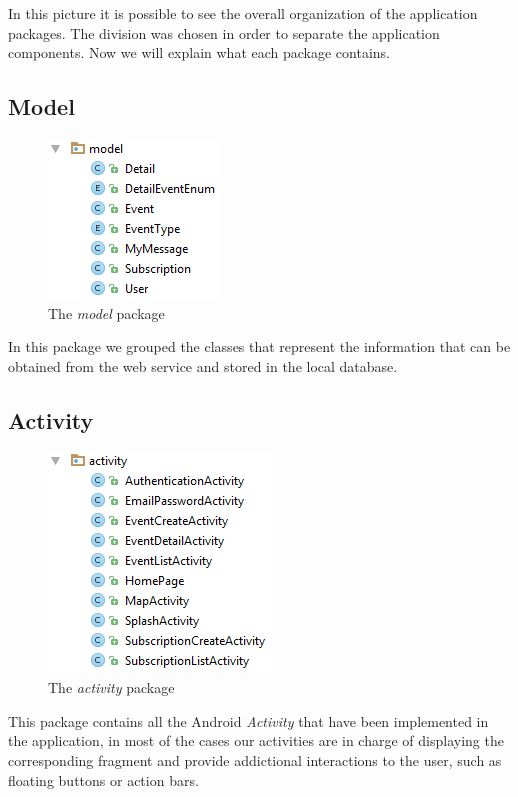 \documentclass[a4paper]{scrreprt}
\begin{document}
In this picture it is possible to see the overall organization of the application packages. The division was chosen in order to separate the application components. Now we will explain what each package contains.

\subsection{Model}
\begin{figure}[H]
	\centering
	\includegraphics{pack_model}
	\caption{The \emph{model} package}
\end{figure}
In this package we grouped the classes that represent the information that can be obtained from the web service and stored in the local database.

\subsection{Activity}
\begin{figure}[H]
	\centering
	\includegraphics{pack_activity}
	\caption{The \emph{activity} package}
\end{figure}
This package contains all the Android \emph{Activity} that have been implemented in the application, in most of the cases our activities are in charge of displaying the corresponding fragment and provide addictional interactions to the user, such as floating buttons or action bars.
\end{document}
